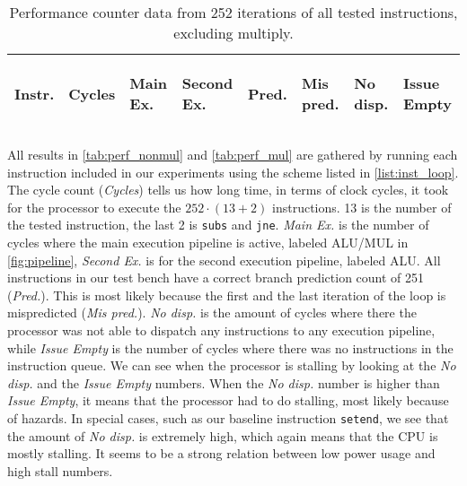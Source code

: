 \begin{table}
    \centering
    \begin{tabular}{|p{0.7cm}|R{0.8cm}R{0.6cm}R{0.85cm}R{0.6cm}R{0.45cm}R{0.75cm}R{0.72cm}|}
        \hline
        \centering
        Instr. &
        \centering
        Cycles &
        \centering
        Main Ex. &
        \centering
        Second Ex. &
        \centering
        Pred.&
        \centering
        Mis pred.&
        \centering
        No disp. &
        \begin{centering}
        Issue Empty
        \end{centering}
        \\
        \hline
        
        \hline
    \end{tabular}
    \caption{Performance counter data from 252 iterations of all tested
    instructions, excluding multiply.}
    \label{tab:perf_nonmul}
    \hfill
\end{table}


All results in \autoref{tab:perf_nonmul} and \autoref{tab:perf_mul} are gathered
by running each instruction included in our experiments using the scheme listed
in \autoref{list:inst_loop}.  The cycle count (\emph{Cycles}) tells us how long
time, in terms of clock cycles, it took for the processor to execute the $252
\cdot (13+2)$ instructions. 13 is the number of the tested instruction, the last
2 is \texttt{subs} and \texttt{jne}.  \emph{Main Ex.} is the number of cycles
where the main execution pipeline is active, labeled ALU/MUL in
\autoref{fig:pipeline}, \emph{Second Ex.} is for the second execution pipeline,
labeled ALU.  All instructions in our test bench have a correct branch
prediction count of 251 (\emph{Pred.}). This is most likely because the first
and the last iteration of the loop is mispredicted (\emph{Mis pred.}).  \emph{No
disp.} is the amount of cycles where there the processor was not able to
dispatch any instructions to any execution pipeline, while \emph{Issue Empty} is
the number of cycles where there was no instructions in the instruction queue.
We can see when the processor is stalling by looking at the \emph{No disp.} and
the \emph{Issue Empty} numbers.  When the \emph{No disp.} number is higher than
\emph{Issue Empty}, it means that the processor had to do stalling, most likely
because of hazards. In special cases, such as our baseline instruction
\texttt{setend}, we see that the amount of \emph{No disp.} is extremely high,
which again means that the CPU is mostly stalling. It seems to be a strong
relation between low power usage and high stall numbers.

